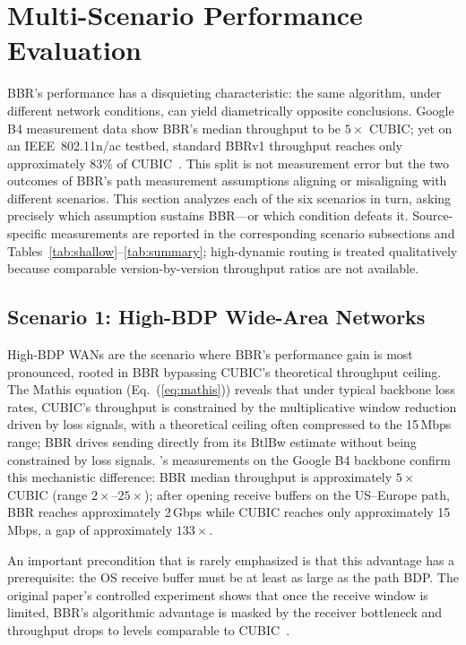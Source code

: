 \documentclass[a4paper,fleqn]{cas-sc}
\begin{document}
\section{Multi-Scenario Performance Evaluation}
\label{sec:comparison}

BBR's performance has a disquieting characteristic: the same algorithm, under
different network conditions, can yield diametrically opposite conclusions.
Google B4 measurement data show BBR's median throughput to be $5\times$ CUBIC;
yet on an IEEE~802.11n/ac testbed, standard BBRv1 throughput reaches only
approximately 83\% of CUBIC~\citep{grazia2020bbrp}. This split is not measurement error but the two outcomes of BBR's
path measurement assumptions aligning or misaligning with different scenarios.
This section analyzes each of the six scenarios in turn, asking precisely which
assumption sustains BBR---or which condition defeats it. Source-specific
measurements are reported in the corresponding scenario subsections and
Tables~\ref{tab:shallow}--\ref{tab:summary}; high-dynamic routing is treated
qualitatively because comparable version-by-version throughput ratios are not
available.

\subsection{Scenario 1: High-BDP Wide-Area Networks}
\label{sec:wan}

High-BDP WANs are the scenario where BBR's performance gain is most pronounced,
rooted in BBR bypassing CUBIC's theoretical throughput ceiling. The Mathis
equation (Eq.~(\ref{eq:mathis})) reveals that under typical backbone loss rates,
CUBIC's throughput is constrained by the multiplicative window reduction driven
by loss signals, with a theoretical ceiling often compressed to the 15\,Mbps
range; BBR drives sending directly from its BtlBw estimate without being
constrained by loss signals. \citet{cardwell2017bbr}'s measurements on the
Google B4 backbone confirm this mechanistic difference: BBR median throughput is
approximately $5\times$ CUBIC (range $2\times$--$25\times$); after opening
receive buffers on the US--Europe path, BBR reaches approximately 2\,Gbps while
CUBIC reaches only approximately 15\,Mbps, a gap of approximately $133\times$.

An important precondition that is rarely emphasized is that this advantage has a
prerequisite: the OS receive buffer must be at least as large as the path BDP.
The original paper's controlled experiment shows that once the receive window is
limited, BBR's algorithmic advantage is masked by the receiver bottleneck and
throughput drops to levels comparable to CUBIC~\citep{cardwell2017bbr}.
\end{document}
